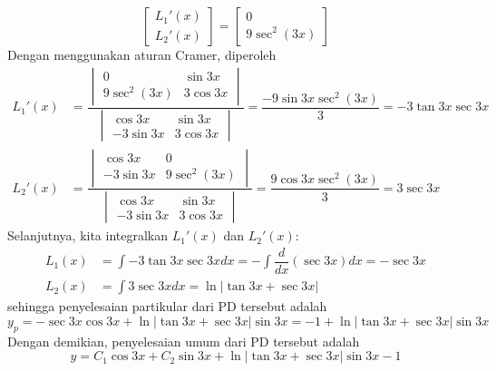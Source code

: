 \documentclass[10pt,openany,a4paper]{article}
\begin{document}
\begin{enumerate}
\[\begin{bmatrix}
            L_1'(x) \\
            L_2'(x)
          \end{bmatrix}
          =
          \begin{bmatrix}
            0 \\
            9 \sec^2(3x)
          \end{bmatrix}
        \]
        Dengan menggunakan aturan Cramer, diperoleh
        \begin{align*}
          L_1'(x) & = \dfrac{
            \begin{vmatrix}
              0           & \sin 3x  \\
              9\sec^2(3x) & 3\cos 3x
            \end{vmatrix}
          }{
            \begin{vmatrix}
              \cos 3x   & \sin 3x  \\
              -3\sin 3x & 3\cos 3x
            \end{vmatrix}
          } = \dfrac{-9\sin 3x \sec^2(3x)}{3} = -3\tan 3x \sec 3x \\
          L_2'(x) & = \dfrac{
            \begin{vmatrix}
              \cos 3x   & 0           \\
              -3\sin 3x & 9\sec^2(3x)
            \end{vmatrix}
          }{
            \begin{vmatrix}
              \cos 3x   & \sin 3x  \\
              -3\sin 3x & 3\cos 3x
            \end{vmatrix}
          } = \dfrac{9\cos 3x \sec^2(3x)}{3} = 3\sec 3x
        \end{align*}
        Selanjutnya, kita integralkan $L_1'(x)$ dan $L_2'(x)$:
        \begin{align*}
          L_1(x) & = \int -3\tan 3x \sec 3x dx = -\int \dfrac{d}{dx}(\sec 3x) dx = -\sec 3x \\
          L_2(x) & = \int 3\sec 3x dx = \ln|\tan 3x + \sec 3x|
        \end{align*}
        sehingga penyelesaian partikular dari PD tersebut adalah
        \[
          y_p = -\sec 3x \cos 3x + \ln|\tan 3x + \sec 3x| \sin 3x = -1 + \ln|\tan 3x + \sec 3x| \sin 3x
        \]
        Dengan demikian, penyelesaian umum dari PD tersebut adalah
        \[
          y = C_1 \cos 3x + C_2 \sin 3x + \ln|\tan 3x + \sec 3x| \sin 3x -1
        \]


\end{enumerate}
\end{document}
